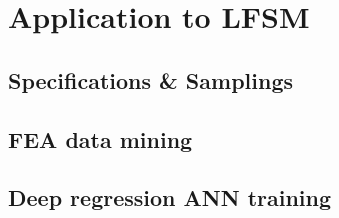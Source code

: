     \section{Application to \ac{LFSM}}               \label{Chapter:RSM/LFSM}
    
    
        \subsection{Specifications \& Samplings}    \label{Chapter:RSM/LFSM/spec}
        
        
        \subsection{\acs{FEA} data mining}          \label{Chapter:RSM/LFSM/data mining}
        
        
        \subsection{Deep regression ANN training}   \label{Chapter:RSM/LFSM/ANN training}
        
        
